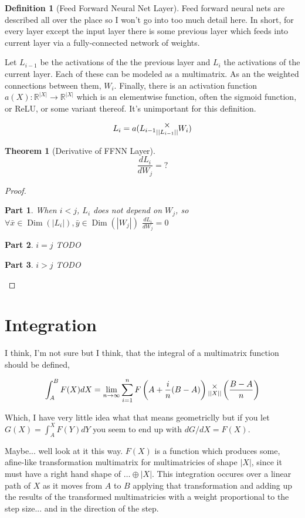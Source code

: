 \documentclass[12pt]{book}
\theoremstyle{definition}
\newtheorem{definition}{Definition}[chapter]
\theoremstyle{plain}
\newtheorem{theorem}{Theorem}[chapter]
\theoremstyle{ppart}
\newtheorem{ppart}{Part}
\theoremstyle{case}
\theoremstyle{solution}
\DeclareMathOperator{\Dim}{Dim}
\newcommand{\mmult}[1]{\text{\raisebox{1ex}{$\underset{#1}{\times}$}}}
\begin{document}
\begin{definition}[Feed Forward Neural Net Layer]
Feed forward neural nets are described all over the place so I won't go into too
much detail here. In short, for every layer except the input layer there is some
previous layer which feeds into current layer via a fully-connected network of
weights.

Let $L_{i-1}$ be the activations of the the previous layer and $L_i$ the activations
of the current layer. Each of these can be modeled as a multimatrix. As an the weighted
connections between them, $W_i$. Finally, there is an activation function
$a(X) : \mathbb{R}^{|X|} \to \mathbb{R}^{|X|}$ which is an elementwise function,
often the sigmoid function, or ReLU, or some variant thereof. It's unimportant for this
definition.

\[ L_i = a(L_{i-1} \mmult{||L_{i-1}||} W_i) \]
\end{definition}

\begin{theorem}[Derivative of FFNN Layer]
\[ \frac{dL_i}{dW_j} = ? \]
\end{theorem}
\begin{proof}
\begin{ppart} When $i < j$,
$L_i$ does not depend on $W_j$, so 
$\forall \bar{x} \in \Dim(|L_i|), \bar{y} \in \Dim(|W_j|)$
$\frac{dL_i}{dW_j} = 0$
\end{ppart}
\begin{ppart} $i = j$
TODO
\end{ppart}
\begin{ppart} $i > j$
TODO
\end{ppart}
\end{proof}

\chapter{Integration}

I think, I'm not sure but I think, that the integral of a multimatrix function should
be defined,

\[
 \int_A^B F(X) dX = \lim_{n \to \infty}
 \sum_{i=1}^n
  F\left(A+\frac{i}{n}(B-A)\right)
  \mmult{||X||}
  \left(\frac{B-A}{n}\right)
\]

Which, I have very little idea what that means geometriclly but
if you let $G(X) = \int_A^X F(Y) dY$ you seem to end up with $dG/dX = F(X)$.

Maybe... well look at it this way. $F(X)$ is a function which produces some,
afine-like transformation multimatrix for multimatricies of shape $|X|$,
since it must have a right hand shape of $\ldots \oplus |X|$. This integration
occures over a linear path of $X$ as it moves from $A$ to $B$ applying that
transformation and adding up the results of the transformed multimatricies with
a weight proportional to the step size... and in the direction of the step.
\end{document}
